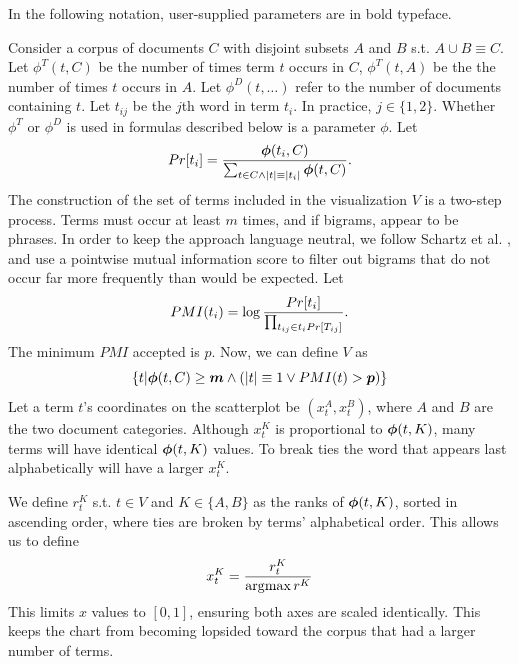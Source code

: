 \documentclass[11pt,a4paper]{article}
\begin{document}
In the following notation, user-supplied parameters are in bold typeface. 

Consider a corpus of documents $C$ with disjoint subsets $A$ and $B$ s.t. $A \cup B \equiv C$. Let $\phi^T(t,C)$ be the number of times term $t$ occurs in $C$, $\phi^{T}(t,A)$ be the the number of times $t$ occurs in $A$. Let $\phi^{D}(t,\ldots)$ refer to the number of documents containing $t$.  Let $t_{ij}$ be the $j$th word in term $t_i$.  In practice, $j \in \{1,2\}$.   Whether $\phi^T$ or $\phi^D$ is used in formulas described below is a parameter \mbox{\boldmath$\phi$}.  Let
\begin{equation}
\vspace{-.2cm}
Pr[t_i] = \frac{\mbox{\boldmath$\phi$}(t_i,C)}{\sum_{t \in C\wedge|t|\equiv|t_i|} \mbox{\boldmath$\phi$}(t,C)}.
\vspace{-.1cm}
\end{equation}
The construction of the set of terms included in the visualization $V$ is a two-step process. Terms must occur at least \mbox{\boldmath$m$} times, and if bigrams, appear to be phrases.  In order to keep the approach language neutral, we follow Schartz et al. , and use a pointwise mutual information score to filter out bigrams that do not occur far more frequently than would be expected.  Let
\begin{equation}
\vspace{-.2cm}
PMI(t_i) = \log \frac{Pr[t_i]}{\prod_{t_{ij}\in t_i{Pr[T_{ij}]}}}.
\end{equation}
The minimum $PMI$ accepted is \mbox{\boldmath$p$}. Now, we can define $V$ as 
\begin{equation}
\{t|\mbox{\boldmath$\phi$}(t,C)\geq\mbox{\boldmath$m$} \wedge (|t| \equiv 1 \vee PMI(t) > \mbox{\boldmath$p$})\}
\end{equation}
Let a term $t$'s coordinates on the scatterplot be $(x^{A}_{t}, x^{B}_t)$, where $A$ and $B$ are the two document categories. Although $x^{K}_t$ is proportional to $\mbox{\boldmath$\phi$}(t,K)$, many terms will have identical $\mbox{\boldmath$\phi$}(t,K)$ values.  To break ties the word that appears last alphabetically will have a larger $x^{K}_t$.

We define $r^{K}_t$ s.t. $t \in V$ and $K \in \{A,B\}$ as the ranks of $\mbox{\boldmath$\phi$}(t,K)$, sorted in ascending order, where ties are broken by terms' alphabetical order.  This allows us to define \vspace{-.2cm}
\begin{equation}
\vspace{-.2cm}
x^{K}_t = \frac{r^{K}_t}{\arg\!\max r^{K}}
\end{equation}
This limits $x$ values to $[0,1]$, ensuring both axes are scaled identically.  This keeps the chart from becoming lopsided toward the corpus that had a larger number of terms. 
\end{document}
